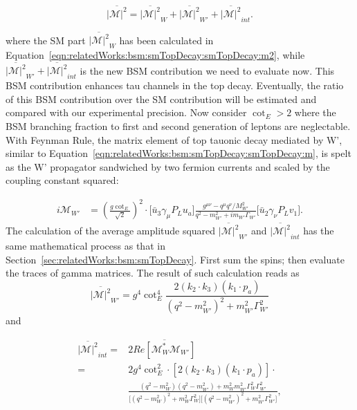 \begin{equation}
	\overline{ |\mathcal{M}|^2 }  = \overline{ |\mathcal{M}|^2 } _{W} +  \overline{ |\mathcal{M}|^2 } _{W'} +  \overline{ |\mathcal{M}|^2 } _{int} .
\end{equation}

\noindent where the SM part $\overline{ |\mathcal{M}|^2 } _{W} $  has been calculated in Equation~\ref{eqn:relatedWorks:bsm:smTopDecay:smTopDecay:m2}, while $\overline{ |\mathcal{M}|^2 } _{W'} +  \overline{ |\mathcal{M}|^2 } _{int}$ is the new BSM contribution we need to evaluate now. This BSM contribution enhances tau channels in the top decay. Eventually, the ratio of this BSM contribution over the SM contribution will be estimated and compared with our experimental precision. Now consider $\cot_E > 2$ where the BSM branching fraction to first and second generation of leptons are neglectable. With Feynman Rule, the matrix element of top tauonic decay mediated by W', similar to Equation~\ref{eqn:relatedWorks:bsm:smTopDecay:smTopDecay:m}, is spelt as the W' propagator sandwiched by two fermion currents and scaled by the coupling constant squared:

\begin{equation}
\begin{split}
	i \mathcal{M}_{W'}  & =  (\frac{g \cot_E}{\sqrt{2}})^2 \cdot 
	\big[ \bar{u}_3 \gamma_\mu P_L u_a \big] 
	\frac{g^{\mu \nu} - q^\mu q^\nu/M^2_{W'}}{q^2-m^2_{W'} + i m_{W'} \Gamma_{W'}} 
	\big[ \bar{u}_2 \gamma_\nu P_L v_1 \big] .
\end{split}
\end{equation}
\noindent The calculation of the average amplitude squared  $\overline{ |\mathcal{M}|^2 } _{W'} $ and $\overline{ |\mathcal{M}|^2 } _{int}$ has the same mathematical process as that in Section~\ref{sec:relatedWorks:bsm:smTopDecay}. First sum the spins; then evaluate the traces of gamma matrices. The result of such calculation reads as
\begin{equation}
	\overline{ |\mathcal{M}|^2 }_{W'} =  g^4 \cot_E^4 \frac{2  (  k_2 \cdot k_3) (  k_1 \cdot p_a) }{ (  q^2-m^2_{W'})^2 +  m^2_{W'} \Gamma^2_{W'} }  
\end{equation}
\noindent and

\begin{equation}
\begin{split}
    \overline{ |\mathcal{M}|^2 } _{int} = &   2 \overline{ Re[\mathcal{M}^*_W \mathcal{M}_{W'}] }  \\
    =& 2 g ^4\cot^2_E  \cdot  [2  (  k_2 \cdot k_3) (  k_1 \cdot p_a) ] \cdot \\
    &\frac 
    {( q^2-m^2_{W}) ( q^2-m^2_{W'}) + m^2_{W}  m^2_{W'}  \Gamma^2_{W} \Gamma^2_{W'} }
    { \big[ ( q^2-m^2_{W})^2 +  m^2_{W} \Gamma^2_{W} \big] \big[ (  q^2-m^2_{W'})^2 +  m^2_{W'} \Gamma^2_{W'} \big] }   
    ,
\end{split}
\end{equation}

